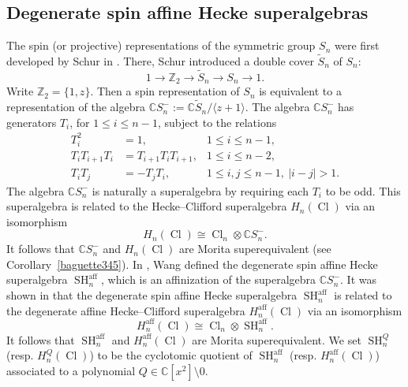 \documentclass[11pt]{amsart}
\theoremstyle{definition}
\numberwithin{equation}{section}
\begin{document}
\subsection{Degenerate spin affine Hecke superalgebras}
The spin (or projective) representations of the symmetric group $ S_{n} $ were first developed by Schur in \cite{Schur}. There, Schur introduced a double cover $ \tilde{S}_{n} $ of $ S_{n} $:
\begin{equation*}
1 \rightarrow \mathbb{Z}_{2} \rightarrow \tilde{S}_{n} \rightarrow S_{n} \rightarrow 1.
\end{equation*}
Write $ \mathbb{Z}_{2} = \{1,z\} $. Then a spin representation of $ S_{n} $ is equivalent to a representation of the algebra $ \mathbb{C}S_{n}^{-} := \mathbb{C}\tilde{S}_{n} / \langle z+1 \rangle $. The algebra $ \mathbb{C}S_{n}^{-} $ has generators $ T_{i} $, for $ 1 \leq i \leq n-1 $, subject to the relations
\begin{align*}
T_{i}^{2} &= 1, & 1 \leq i \leq n-1, 
\\ T_{i}T_{i+1}T_{i} &= T_{i+1}T_{i}T_{i+1}, & 1 \leq i \leq n-2,
\\ T_{i}T_{j} &= -T_{j}T_{i}, & 1 \leq i,j \leq n-1, \ |i-j| > 1.
\end{align*}
The algebra $ \mathbb{C}S_{n}^{-} $ is naturally a superalgebra by requiring each $ T_{i} $ to be odd. This superalgebra is related to the Hecke--Clifford superalgebra $ H_{n}(\operatorname{Cl}) $ via an isomorphism
\begin{equation*}
H_{n}(\operatorname{Cl}) \cong \operatorname{Cl}_{n} \otimes \mathbb{C}S_{n}^{-}.
\end{equation*}
It follows that $ \mathbb{C}S_{n}^{-} $ and $ H_{n}(\operatorname{Cl}) $ are Morita superequivalent (see Corollary~\ref{baguette345}). In \cite[§3.3]{Wang}, Wang defined the degenerate spin affine Hecke superalgebra $ \operatorname{SH}_{n}^{\operatorname{aff}} $, which is an affinization of the superalgebra $ \mathbb{C}S_{n}^{-} $. It was shown in \cite[Thm.~4.1]{Wang} that the degenerate spin affine Hecke superalgebra $ \operatorname{SH}_{n}^{\operatorname{aff}} $ is related to the degenerate affine Hecke--Clifford superalgebra $ H_{n}^{\operatorname{aff}}(\operatorname{Cl}) $ via an isomorphism
\begin{equation} \label{glebe}
H_{n}^{\operatorname{aff}}(\operatorname{Cl}) \cong \operatorname{Cl}_{n} \otimes \operatorname{SH}_{n}^{\operatorname{aff}}.
\end{equation}
It follows that $ \operatorname{SH}_{n}^{\operatorname{aff}} $ and $ H_{n}^{\operatorname{aff}}(\operatorname{Cl}) $ are Morita superequivalent. We set $ \operatorname{SH}_{n}^{Q} $ (resp. $ H_{n}^{Q}(\operatorname{Cl}) $) to be the cyclotomic quotient of $ \operatorname{SH}_{n}^{\operatorname{aff}} $ (resp. $ H_{n}^{\operatorname{aff}}(\operatorname{Cl}) $) associated to a polynomial $ Q \in \mathbb{C}[x^{2}] \setminus 0 $.
\end{document}
